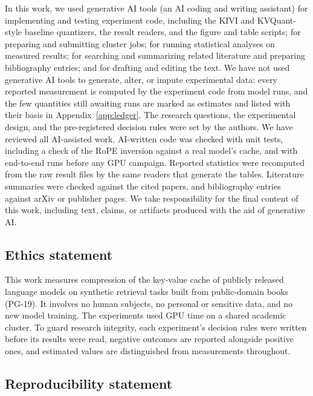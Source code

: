 \documentclass{article}
\theoremstyle{definition}
\begin{document}
In this work, we used generative AI tools (an AI coding and writing assistant) for implementing and testing experiment code, including the KIVI and KVQuant-style baseline quantizers, the result readers, and the figure and table scripts; for preparing and submitting cluster jobs; for running statistical analyses on measured results; for searching and summarizing related literature and preparing bibliography entries; and for drafting and editing the text.  We have not used generative AI tools to generate, alter, or impute experimental data: every reported measurement is computed by the experiment code from model runs, and the few quantities still awaiting runs are marked as estimates and listed with their basis in Appendix~\ref{app:ledger}.  The research questions, the experimental design, and the pre-registered decision rules were set by the authors.  We have reviewed all AI-assisted work.  AI-written code was checked with unit tests, including a check of the RoPE inversion against a real model's cache, and with end-to-end runs before any GPU campaign.  Reported statistics were recomputed from the raw result files by the same readers that generate the tables.  Literature summaries were checked against the cited papers, and bibliography entries against arXiv or publisher pages.  We take responsibility for the final content of this work, including text, claims, or artifacts produced with the aid of generative AI.

\subsection*{Ethics statement}

This work measures compression of the key-value cache of publicly released language models on synthetic retrieval tasks built from public-domain books (PG-19).  It involves no human subjects, no personal or sensitive data, and no new model training.  The experiments used GPU time on a shared academic cluster.  To guard research integrity, each experiment's decision rules were written before its results were read, negative outcomes are reported alongside positive ones, and estimated values are distinguished from measurements throughout.

\subsection*{Reproducibility statement}
\end{document}

